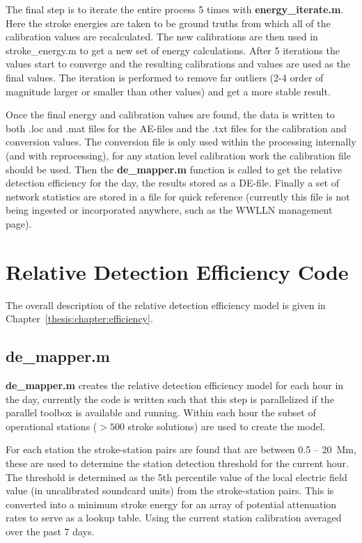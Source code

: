 The final step is to iterate the entire process 5 times with {\bf energy\_iterate.m}.
Here the stroke energies are taken to be ground truths from which all of the calibration values are recalculated.
The new calibrations are then used in stroke\_energy.m to get a new set of energy calculations.
After 5 iterations the values start to converge and the resulting calibrations and values are used as the final values.
The iteration is performed to remove far outliers (2-4 order of magnitude larger or smaller than other values) and get a more stable result.

Once the final energy and calibration values are found, the data is written to both .loc and .mat files for the AE-files and the .txt files for the calibration and conversion values.
The conversion file is only used within the processing internally (and with reprocessing), for any station level calibration work the calibration file should be used.
Then the {\bf de\_mapper.m} function is called to get the relative detection efficiency for the day, the results stored as a DE-file.
Finally a set of network statistics are stored in a file for quick reference (currently this file is not being ingested or incorporated anywhere, such as the WWLLN management page).

\section{Relative Detection Efficiency Code}

The overall description of the relative detection efficiency model is given in Chapter~\ref{thesis:chapter:efficiency}.

\subsection{de\_mapper.m}

{\bf de\_mapper.m} creates the relative detection efficiency model for each hour in the day, currently the code is written such that this step is parallelized if the parallel toolbox is available and running.
Within each hour the subset of operational stations ($>500$ stroke solutions) are used to create the model.

For each station the stroke-station pairs are found that are between 0.5 -- 20~Mm, these are used to determine the station detection threshold for the current hour.
The threshold is determined as the 5th percentile value of the local electric field value (in uncalibrated soundcard units) from the stroke-station pairs.
This is converted into a minimum stroke energy for an array of potential attenuation rates to serve as a lookup table.
Using the current station calibration averaged over the past 7 days.

